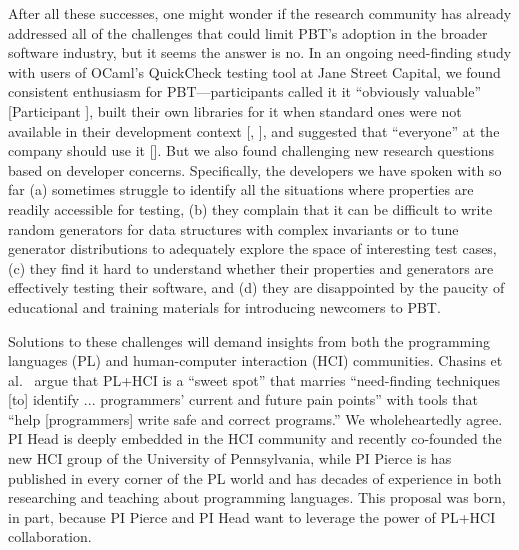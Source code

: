 After all these successes, one might wonder if the research community has already
addressed all of the challenges that could limit PBT's adoption
in the broader software industry, but it
seems the answer is no.
In an ongoing need-finding study with users of OCaml's QuickCheck testing tool
at Jane Street Capital, we found
consistent enthusiasm for PBT---participants called it it
``obviously valuable'' [Participant ],
built their own libraries for it when standard ones were not available in their
development context [,
], and suggested that ``everyone'' at the company should use it
[]. But we also found
challenging new research questions based on developer concerns.
Specifically, the developers we have spoken with so far
%
(a) sometimes struggle
to identify all the situations where properties are readily accessible for
testing,
%
(b) they complain that it
can be difficult to write random generators for data structures
with complex invariants or to tune generator distributions to
adequately explore the space of interesting test cases,
%
(c) they find
it hard to understand whether their properties and generators are
effectively testing their software, and
%
(d) they are disappointed by
the paucity of educational and training materials for introducing
newcomers to PBT.\iflater{}\fi

Solutions to these challenges will demand insights from both the
programming languages (PL) and
human-computer interaction (HCI) communities.  Chasins et
al.~\cite{chasins_pl_2021} argue that PL+HCI is a ``sweet spot'' that marries
``need-finding techniques [to] identify ...  programmers' current and future
pain points'' with tools that ``help [programmers] write safe and correct
programs.'' We wholeheartedly agree.
PI Head
is deeply embedded in the HCI community and recently co-founded the new HCI
group of the University of Pennsylvania, while PI Pierce is has published in
every corner of the PL world and has decades of experience in both researching
and teaching about programming languages.
This proposal was born, in part, because PI
Pierce and PI Head want to leverage the power of PL+HCI collaboration.


